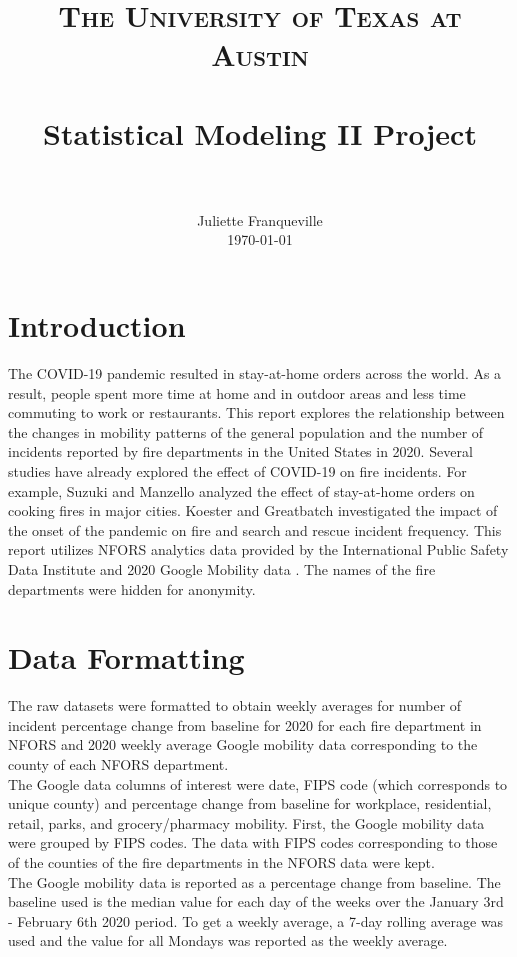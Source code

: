 \documentclass[paper=a4, fontsize=11pt]{scrartcl}
\title{
		\usefont{OT1}{bch}{b}{n}
		\normalfont \normalsize \textsc{The University of Texas at Austin} \\ [25pt]
		\horrule{0.5pt} \\[0.4cm]
		\huge Statistical Modeling II Project \\
		\horrule{2pt} \\[0.5cm]
}
\author{
		\normalfont 								\normalsize
        Juliette Franqueville\\[-3pt]		\normalsize
        \today
}
\date{}
\numberwithin{equation}{section}		%
\numberwithin{figure}{section}			%
\numberwithin{table}{section}				%
\begin{document}
\maketitle
\newpage
\section{Introduction}

The COVID-19 pandemic resulted in stay-at-home orders across the world. As a result, people spent more time at home and in outdoor areas and less time commuting to work or restaurants. This report explores the relationship between the changes in mobility patterns of the general population and the number of incidents reported by fire departments in the United States in 2020. Several studies have already explored the effect of COVID-19 on fire incidents. For example, Suzuki and Manzello \cite{fire_paper} analyzed the effect of stay-at-home orders on cooking fires in major cities. Koester and Greatbatch \cite{koester2020comparing} investigated the impact of the onset of the pandemic on fire and search and rescue incident frequency. This report utilizes NFORS \cite{nfors} analytics data provided by the International Public Safety Data Institute and 2020 Google Mobility data \cite{google}. The names of the fire departments were hidden for anonymity. 

\section{Data Formatting}
The raw datasets were formatted to obtain weekly averages for number of incident percentage change from baseline for 2020 for each fire department in NFORS and 2020 weekly average Google mobility data corresponding to the county of each NFORS department.\\


The Google data columns of interest were date,  FIPS code (which corresponds to unique county) and percentage change from baseline for workplace, residential, retail, parks, and grocery/pharmacy mobility. First, the Google mobility data were grouped by FIPS codes.  The data with FIPS codes corresponding to those of the counties of the fire departments in the NFORS data were kept.\\



The Google mobility data is reported as a percentage change from baseline. The baseline used is the median value for each day of the weeks over the January 3rd - February 6th 2020 period. To get a weekly average, a 7-day rolling average was used and the value for all Mondays was reported as the weekly average. \\
\end{document}
